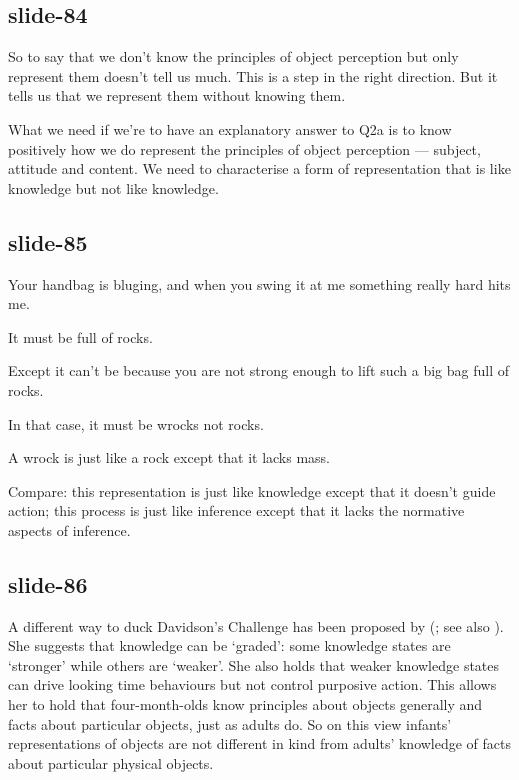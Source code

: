 \documentclass[12pt,\papersize]{extarticle}
\begin{document}
\subsection{slide-84}
So to say that we don't know the principles of object perception but only represent them doesn't tell us much.
This is a step in the right direction.
But it tells us that we represent them without knowing them.

What we need if we're to have an explanatory answer to Q2a is to know positively how we do represent the principles of object perception --- subject, attitude and content.
We need to characterise a form of representation that is like knowledge but not like knowledge.

\subsection{slide-85}
Your handbag is bluging, and when you swing it at me something really hard hits me.

It must be full of rocks.

Except it can't be because you are not strong enough to lift such a big bag full of rocks.

In that case, it must be wrocks not rocks.

A wrock is just like a rock except that it lacks mass.

Compare: this representation is just like knowledge except that it doesn't guide action; this process is just like inference except that it lacks the normative aspects of inference.

\subsection{slide-86}
A different way to duck Davidson’s Challenge
has been proposed by \citeauthor{Munakata:2001ch} (\citeyear{Munakata:2001ch}; see also \citealp{munakata:1997_rethinking}).
She suggests that knowledge can be ‘graded’: some knowledge states are ‘stronger’ while others are ‘weaker’.
She also holds that weaker knowledge states can drive looking time behaviours but not control purposive action.
This allows her to hold that four-month-olds know principles about objects generally and facts about particular objects,
just as adults do.
So on this view infants’ representations of objects are not different in kind from adults’ knowledge of facts about particular physical objects.
\end{document}
